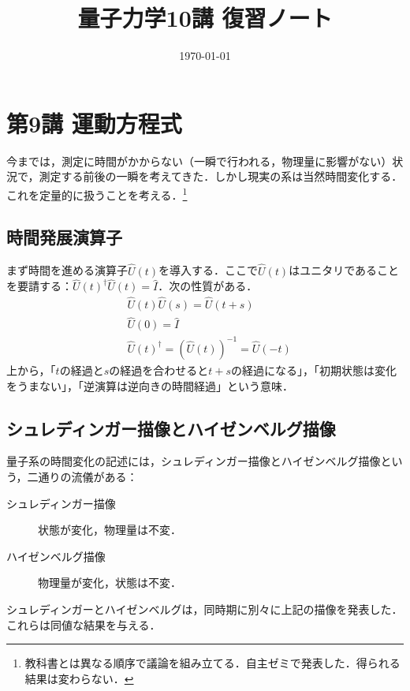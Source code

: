 \documentclass[a4paper,10pt,uplatex]{jsarticle}
\begin{document}
\title{量子力学10講 復習ノート}
\author{}
\date{\today}
\maketitle

\renewcommand{\A}{\hat{A}}
\newcommand{\U}{\hat{U}}
\newcommand{\X}{\hat{X}}
\renewcommand{\P}{\hat{P}}
\newcommand{\I}{\hat{I}}
\renewcommand{\H}{\hat{H}}
\renewcommand{\N}{\hat{N}}
\renewcommand{\inf}{\infty}


\section{第9講 運動方程式}
今までは，測定に時間がかからない（一瞬で行われる，物理量に影響がない）状況で，測定する前後の一瞬を考えてきた．しかし現実の系は当然時間変化する．これを定量的に扱うことを考える．\footnote{教科書とは異なる順序で議論を組み立てる．自主ゼミで発表した．得られる結果は変わらない．}

\subsection{時間発展演算子}
まず時間を進める演算子$\U(t)$を導入する．ここで$\U(t)$はユニタリであることを要請する：$\U(t)^\dagger \U(t) = \I$．次の性質がある．
\begin{align}
    &\hat{U}(t)\hat{U}(s) = \hat{U}(t+s) \\
    &\hat{U}(0) = \hat{I} \\
    &\hat{U}(t)^\dagger = (\hat{U}(t))^{-1} = \hat{U}(-t)
\end{align}
上から，「$t$の経過と$s$の経過を合わせると$t+s$の経過になる」，「初期状態は変化をうまない」，「逆演算は逆向きの時間経過」という意味．

\subsection{シュレディンガー描像とハイゼンベルグ描像}
量子系の時間変化の記述には，シュレディンガー描像とハイゼンベルグ描像という，二通りの流儀がある：
\begin{description}
    \item[シュレディンガー描像] 状態が変化，物理量は不変．
    \item[ハイゼンベルグ描像] 物理量が変化，状態は不変．
\end{description}
シュレディンガーとハイゼンベルグは，同時期に別々に上記の描像を発表した．これらは同値な結果を与える．
\end{document}

